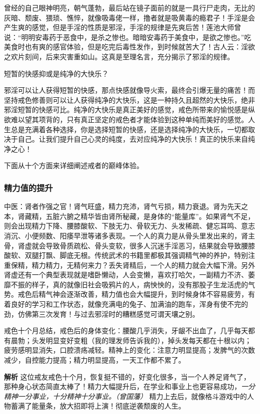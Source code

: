 曾经的自己眼神明亮，朝气蓬勃，最后站在镜子面前的就是一具行尸走肉，无比的灰暗、颓废、猥琐、憔悴，就像吸毒佬一样，撸者就是吸黄毒的瘾君子！手淫是会产生爽的感觉，但是手淫的性质是邪淫，手淫的规律是先爽后苦！莲池大师曾说：“明明安毒药于恶食中，是杀之惨也。暗暗安毒药于美食中，是欲之惨也。”吃美食时也有爽的感官体验，但是吃完后毒性发作，到时候就苦大了！古人云：淫欲之欢片刻间，后来灾害重如山。这真是至理名言，充分揭示了邪淫的规律。

短暂的快感抑或是纯净的大快乐？

邪淫可以让人获得短暂的快感，那点快感就像导火索，最终会引爆无量的痛苦！而坚持戒色修善则可以让人获得纯净的大快乐，这是一种持久且超然的大快乐，绝非邪淫短暂的快感可比。纯净的大快乐是真正美好的感觉，戒色所带来的愉悦感是纵欲难以望其项背的，只有真正坚定的戒色者才能体验到这种单纯而美好的感觉。人生总是充满着各种选择，你是选择短暂的快感，还是选择纯净的大快乐，一切都取决于自己。让我们提升自己心灵的纯度，去对应纯净的大快乐！真正的快乐来自纯净之心！

下面从十个方面来详细阐述戒者的巅峰体验。

\subsubsection{精力值的提升}

中医：肾者作强之官！肾气旺盛，精力充沛，肾气亏损，精力衰退。肾为先天之本，肾藏精，五脏六腑之精华皆由肾所秘藏，是身体的“能量库”。如果肾气不足，则会出现精力下降、腰膝酸软、下肢无力、骨软无力、头发稀疏、健忘耳鸣、意志消沉、小便频数、阳痿早泄等诸多表现。一个人的真力是从骨头里发出来的，肾主骨，肾虚就会导致骨质疏松、骨头变软，很多人沉迷手淫恶习，结果就会导致腰膝酸软、双腿打飘、脚底无根。传统武术的书籍里都极其强调精气神的养护，特别注重保精，精力精力，无精何来力？丢失肾精后，一个人的精力就会大幅下滑。另外肾虚还有一个典型表现就是嗜卧懒动，人会变懒，喜欢打哈欠，一副精力不济、萎靡不振的样子，真的就像旧社会吸鸦片的人，病怏怏的，没有那股子生龙活虎的气势。戒色后精气神会逐渐改善，精力值也会大幅提升，到时候身体不容易疲劳，有着良好的学习和工作状态，就像充满电的兔子、加满油的跑车，浑身有使不完的劲，仿佛第三次发育！与过去邪淫时的糟糕感觉可谓天壤之别。

\begin{case}
    戒色十个月总结，戒色后的身体变化：腰酸几乎消失，牙龈不出血了，几乎每天都有晨勃；头发明显变好变粗（我的理发师告诉我的），掉头发每天都在十根以内；疲劳感明显消失，口腔溃疡减轻。精神上的变化：注意力明显提高；发脾气的次数减少，自控能力提高；精力明显提高，一天工作都不累了。

    \textbf{解析} 这位戒友戒色十个月，恢复挺不错的，好变化很多，当一个人养足肾气了，那种身心状态简直太棒了！精力大幅提升后，在学业和事业上也更容易成功，\textit{一分精神一分事业，十分精神十分事业。（曾国藩）} 精力上去后，就像格斗游戏中的人物蓄满了能量条，放大招即将上演！彻底逆袭颓废的人生。
\end{case}

